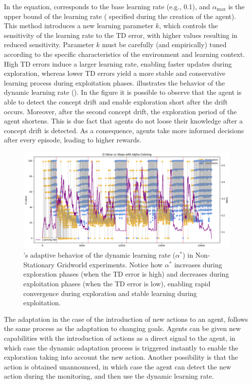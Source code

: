 In the equation, \lrate{\alpha} corresponds to the base learning rate (e.g., 0.1), and $\alpha_{\max}$ 
is the upper bound of the learning rate ( specified during the creation of the agent). This 
method introduces a new learning parameter $k$, which controls the sensitivity of the learning rate to 
the TD error, with higher values resulting in reduced sensitivity. Parameter $k$ must be carefully (and 
empirically) tuned according to the specific characteristics of the environment and learning context. 
High TD errors induce a larger learning rate, enabling faster updates during exploration, whereas 
lower TD errors yield a more stable and conservative learning process during exploitation phases. 
 illustrates the behavior of the dynamic learning rate (\lrate{\alpha^*}). In the figure it 
is possible to observe that the agent is able to detect the concept drift and enable exploration short 
after the drift occurs. Moreover, after the second concept drift, the exploration period of the agent 
shortens. This is due fact that agents do not loose their knowledge after a concept drift is detected. 
As a consequence, agents take more informed decisions after every episode, leading to higher 
rewards. 

\begin{figure}[hptb]
    \centering
    \includegraphics[width=\textwidth]{figures/alpha}
    \caption{\adaptiverl's adaptive behavior of the dynamic learning rate ($\alpha^*$) in Non-Stationary Gridworld experiments. Notice how $\alpha^*$ increases during exploration phases (when the TD error is high) and decreases during exploitation phases (when the TD error is low), enabling rapid convergence during exploration and stable learning during exploitation.}
    \label{fig:alpha}
\end{figure}

The adaptation in the case of the introduction of new actions to an agent, follows the same process 
as the adaptation to changing goals. Agents can be given new capabilities with the introduction of 
actions as a direct signal to the agent, in which case the dynamic adaptation process is triggered 
instantly to enable the exploration taking into account the new action. Another possibility is that the 
action is obtained unannounced, in which case the agent can detect the new action during the 
monitoring, and then use the dynamic learning rate.

